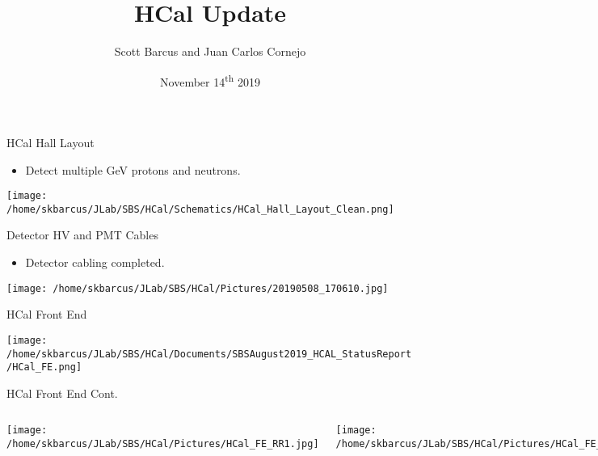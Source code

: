 \documentclass[10pt]{beamer}
\title{HCal Update}
\subtitle{}
\date{November 14\textsuperscript{th} 2019}
\author{Scott Barcus and Juan Carlos Cornejo}
\institute{Jefferson Lab}
\begin{document}
\maketitle

\begin{frame}{HCal Hall Layout}

	\begin{itemize}
		\item Detect multiple GeV protons and neutrons. 
	\end{itemize}

	\begin{center}
	\texttt{[image: /home/skbarcus/JLab/SBS/HCal/Schematics/HCal\_Hall\_Layout\_Clean.png]}
	\end{center}
\end{frame}

\begin{frame}{Detector HV and PMT Cables}

	\begin{itemize}
		\item Detector cabling completed.
	\end{itemize}
	
	\begin{center}
  		\texttt{[image: /home/skbarcus/JLab/SBS/HCal/Pictures/20190508\_170610.jpg]}
  	\end{center}

\end{frame}

\begin{frame}{HCal Front End}

	\texttt{[image: /home/skbarcus/JLab/SBS/HCal/Documents/SBSAugust2019\_HCAL\_StatusReport/HCal\_FE.png]}

\end{frame}

\begin{frame}{HCal Front End Cont.}

    \begin{columns}[T,onlytextwidth]
	\texttt{[image: /home/skbarcus/JLab/SBS/HCal/Pictures/HCal\_FE\_RR1.jpg]}
	
	\texttt{[image: /home/skbarcus/JLab/SBS/HCal/Pictures/HCal\_FE\_RR3.jpg]}
	\end{columns}

\end{frame}
\end{document}
